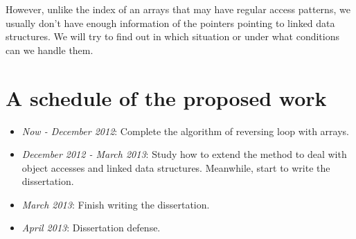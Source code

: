 \documentclass[12pt]{gatech-thesis}
\begin{document}
However, unlike the index of an arrays that may have regular access patterns, we usually don't have enough information of the pointers pointing to linked data structures. 
We will try to find out in which situation or under what conditions can we handle them.


\section{A schedule of the proposed work}

\begin{itemize}
\item \emph{Now - December 2012}: Complete the algorithm of reversing loop with arrays.

\item \emph{December 2012 - March 2013}: Study how to extend the method to deal with object accesses and linked data structures. Meanwhile, start to write the dissertation.

\item \emph{March 2013}: Finish writing the dissertation.

\item \emph{April 2013}: Dissertation defense. 
\end{itemize}


\end{document}
